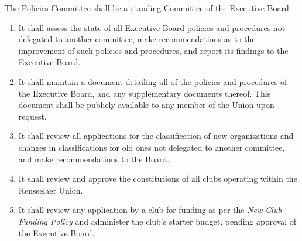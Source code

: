 \item The Policies Committee shall be a standing Committee of the Executive Board.
\begin{enumerate}

    \item It shall assess the state of all Executive Board policies and procedures not delegated to another committee, make recommendations as to the improvement of such policies and procedures, and report its findings to the Executive Board.

    \item It shall maintain a document detailing all of the policies and procedures of the Executive Board, and any supplementary documents thereof. This document shall be publicly available to any member of the Union upon request.

    \item It shall review all applications for the classification of new organizations and changes in classifications for old ones not delegated to another committee, and make recommendations to the Board.

    \item It shall review and approve the constitutions of all clubs operating within the Rensselaer Union.

    \item It shall review any application by a club for funding as per the \textit{New Club Funding Policy} and administer the club’s starter budget, pending approval of the Executive Board.

\end{enumerate}
